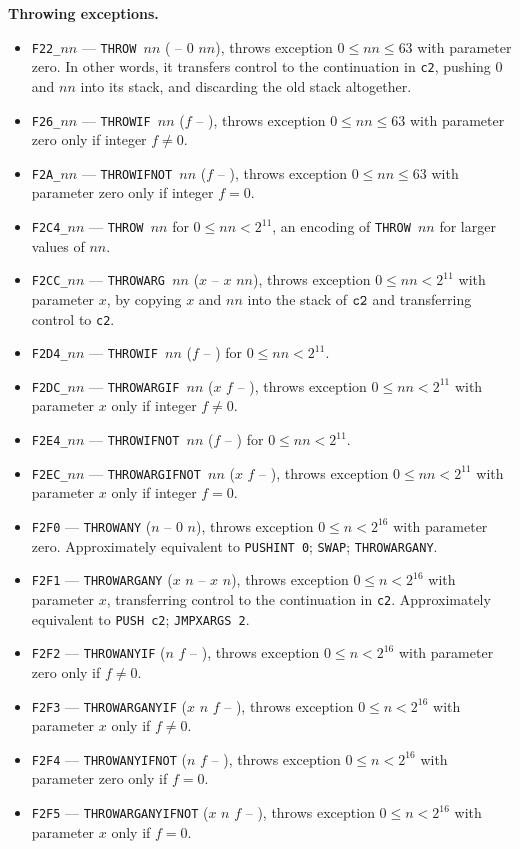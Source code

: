 \documentclass[12pt,oneside]{article}
\def\makepoint#1{\medbreak\noindent{\bf #1.\ }}
\def\nxsubpoint{\refstepcounter{subsubsection}%
  \smallbreak\makepoint{\thesubsubsection}}
\def\emb#1{\textbf{#1.}}
\begin{document}
\nxsubpoint\emb{Throwing exceptions}
\begin{itemize}
\item {\tt F22\_$nn$} --- {\tt THROW $nn$} ( -- $0$ $nn$), throws exception $0\leq nn\leq 63$ with parameter zero. In other words, it transfers control to the continuation in {\tt c2}, pushing $0$ and $nn$ into its stack, and discarding the old stack altogether.
\item {\tt F26\_$nn$} --- {\tt THROWIF $nn$} ($f$ -- ), throws exception $0\leq nn\leq 63$ with  parameter zero only if integer $f\neq0$.
\item {\tt F2A\_$nn$} --- {\tt THROWIFNOT $nn$} ($f$ -- ), throws exception $0\leq nn\leq 63$ with parameter zero only if integer $f=0$.
\item {\tt F2C4\_$nn$} --- {\tt THROW $nn$} for $0\leq nn<2^{11}$, an encoding of {\tt THROW $nn$} for larger values of $nn$.
\item {\tt F2CC\_$nn$} --- {\tt THROWARG $nn$} ($x$ -- $x$ $nn$), throws exception $0\leq nn<2^{11}$ with parameter $x$, by copying $x$ and $nn$ into the stack of ${\tt c2}$ and transferring control to {\tt c2}.
\item {\tt F2D4\_$nn$} --- {\tt THROWIF $nn$} ($f$ -- ) for $0\leq nn<2^{11}$.
\item {\tt F2DC\_$nn$} --- {\tt THROWARGIF $nn$} ($x$ $f$ -- ), throws exception $0\leq nn<2^{11}$ with parameter $x$ only if integer $f\neq0$.
\item {\tt F2E4\_$nn$} --- {\tt THROWIFNOT $nn$} ($f$ -- ) for $0\leq nn<2^{11}$.
\item {\tt F2EC\_$nn$} --- {\tt THROWARGIFNOT $nn$} ($x$ $f$ -- ), throws exception $0\leq nn<2^{11}$ with parameter $x$ only if integer $f=0$.
\item {\tt F2F0} --- {\tt THROWANY} ($n$ -- $0$ $n$), throws exception $0\leq n<2^{16}$ with parameter zero. Approximately equivalent to {\tt PUSHINT 0}; {\tt SWAP}; {\tt THROWARGANY}.
\item {\tt F2F1} --- {\tt THROWARGANY} ($x$ $n$ -- $x$ $n$), throws exception $0\leq n<2^{16}$ with parameter $x$, transferring control to the continuation in {\tt c2}. Approximately equivalent to {\tt PUSH c2}; {\tt JMPXARGS 2}.
\item {\tt F2F2} --- {\tt THROWANYIF} ($n$ $f$ -- ), throws exception $0\leq n<2^{16}$ with parameter zero only if $f\neq0$.
\item {\tt F2F3} --- {\tt THROWARGANYIF} ($x$ $n$ $f$ -- ), throws exception $0\leq n<2^{16}$ with parameter $x$ only if $f\neq0$.
\item {\tt F2F4} --- {\tt THROWANYIFNOT} ($n$ $f$ -- ), throws exception $0\leq n<2^{16}$ with parameter zero only if $f=0$.
\item {\tt F2F5} --- {\tt THROWARGANYIFNOT} ($x$ $n$ $f$ -- ), throws exception $0\leq n<2^{16}$ with parameter $x$ only if $f=0$.
\end{itemize}
\end{document}
